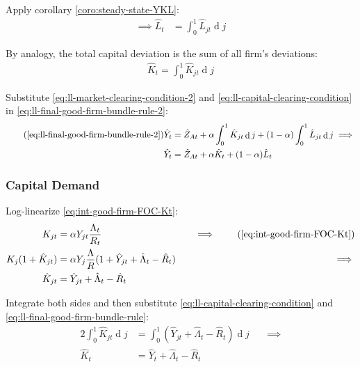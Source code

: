 \documentclass[
	12pt,
	]{article}
\numberwithin{equation}{section}
\DeclareMathOperator{\dif}{d}
\theoremstyle{definition}
\theoremstyle{plain}
\theoremstyle{plain}
\theoremstyle{plain}
\begin{document}
Apply corollary \ref{coro:steady-state-YKL}:
\begin{align}
	\implies \hat{L}_t &= \int_{0}^{1} \hat{L}_{jt} \dif j \label{eq:ll-market-clearing-condition-2}
\end{align}

By analogy, the total capital deviation is the sum of all firm's deviations:
\begin{align}
	\hat{K}_t = \int_{0}^{1} \hat{K}_{jt} \dif j \label{eq:ll-capital-clearing-condition}
\end{align}

Substitute \ref{eq:ll-market-clearing-condition-2} and \ref{eq:ll-capital-clearing-condition} in \ref{eq:ll-final-good-firm-bundle-rule-2}:
\begin{align}
\tag{\ref{eq:ll-final-good-firm-bundle-rule-2}}
	\hat{Y}_t &= \hat{Z}_{At} + \alpha \int_{0}^{1} \hat{K}_{jt} \dif j + (1-\alpha) \int_{0}^{1} \hat{L}_{jt} \dif j \implies \\
	\hat{Y}_t &= \hat{Z}_{At} + \alpha \hat{K}_t + (1-\alpha) \hat{L}_t \label{eq:ll-final-good-firm-bundle-rule-3}
\end{align}


\subsubsection{Capital Demand}

Log-linearize \ref{eq:int-good-firm-FOC-Kt}:
\begin{alignat}{2}
	K_{jt} &= \alpha Y_{jt} \frac{\Lambda_t}{R_t} &\implies \tag{\ref{eq:int-good-firm-FOC-Kt}} \\
	K_j (1+ \hat{K}_{jt}) &= \alpha Y_{j} \frac{\Lambda}{R} (1+ \hat{Y}_{jt} + \hat{\Lambda}_t - \hat{R}_t) \quad &\implies \nonumber \\
	\hat{K}_{jt} &= \hat{Y}_{jt} + \hat{\Lambda}_t - \hat{R}_t \nonumber
\end{alignat}

Integrate both sides and then substitute \ref{eq:ll-capital-clearing-condition} and \ref{eq:ll-final-good-firm-bundle-rule}:
\begin{alignat}{2}
	\int_{0}^{1} \hat{K}_{jt} \dif j &= \int_{0}^{1} \left( \hat{Y}_{jt} + \hat{\Lambda}_t - \hat{R}_t \right) \dif j \quad &\implies \nonumber \\
	\hat{K}_t &= \hat{Y}_t + \hat{\Lambda}_t - \hat{R}_t \label{eq:ll-int-good-firm-FOC-Kt}
\end{alignat}
\end{document}

